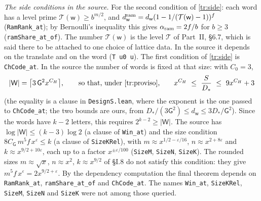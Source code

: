 \documentclass[11pt,letterpaper]{article}
\begin{document}
\emph{The side conditions in the source.} For the second condition of \eqref{tr:side}: each word has a level
prime $\mathcal T(\mathsf w)\ge b^{m/2}$, and
$d^{\rm ram}_{\mathsf w}=d_{\mathsf w}(1-1/(\mathcal T(\mathsf w)-1))^f$ (\texttt{RamRank\_at}); by Bernoulli's
inequality this gives $\alpha_{\rm ram}=2f/b$ for $b\ge3$ (\texttt{ramShare\_at\_of}). The number $\mathcal T(\mathsf w)$ is
the level $\mathcal T$ of Part~II, \S6.7, which is said there to be attached to one choice of lattice data. In
the source it depends on the translate and on the word (\texttt{T u0 u}). The first condition of
\eqref{tr:side} is \texttt{ChCode\_at}. In the source the number of words is fixed at that size: with $C_0=3$,
\begin{equation}\label{tr:words}
 |\mathsf W|=\big\lceil 3\,\mathsf G^2x^{C_H}\big\rceil,\qquad\text{so that, under \eqref{tr:proviso},}\qquad
 x^{C_H}\ \le\ \frac S{D_*}\ \le\ 9x^{C_H}+3
\end{equation}
(the equality is a clause in \texttt{DesignS.lean}, where the exponent is the one passed to
\texttt{ChCode\_at}; the two bounds are ours, from $D_*/(3\mathsf G^2)\le d_{\mathsf w}\le3D_*/\mathsf G^2$).
Since the words have $k-2$ letters, this requires $2^{k-2}\ge|\mathsf W|$. The source has
$\log|\mathsf W|\le(k-3)\log2$ (a clause of \texttt{Win\_at}) and the size condition
$8C_{\mathsf G}\,m^5f\,x^\varepsilon\le k$ (a clause of \texttt{SizeKRel}), with
$m\approx x^{1/2-\varepsilon/16}$, $n\approx x^{2+8\varepsilon}$ and $k\approx x^{9/2+10\varepsilon}$, each up to a
factor $x^{\pm\varepsilon/100}$ (\texttt{SizeM}, \texttt{SizeN}, \texttt{SizeK}). The rounded sizes
$m\approx\sqrt x$, $n\approx x^2$, $k\approx x^{9/2}$ of \S I.8 do not satisfy this condition: they give
$m^5f\,x^\varepsilon=2x^{9/2+\varepsilon}$. By the dependency computation the final theorem depends on
\texttt{RamRank\_at}, \texttt{ramShare\_at\_of} and \texttt{ChCode\_at}. The names \texttt{Win\_at},
\texttt{SizeKRel}, \texttt{SizeM}, \texttt{SizeN} and \texttt{SizeK} were not among those queried.
\end{document}
